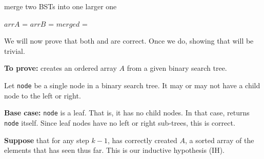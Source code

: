 \documentclass[11pt]{article}
\begin{document}
\begin{algorithm}
\caption{merge two BSTs into one larger one}
\begin{algorithmic}[1]
    \State $arrA$ = 
    \State $arrB$ = 
    \State $merged$ = 
    \State \Return {}
\EndProcedure 
\end{algorithmic}
\end{algorithm}
\pagebreak

We will now prove that both  and  are
correct. Once we do, showing that  will be trivial.

\textbf{To prove:}  creates an ordered array $A$ from a given
binary search tree.

Let \texttt{node} be a single node in a binary search tree. It may or may not
have a child node to the left or right.

\textbf{Base case:} \texttt{node} is a leaf. That is, it has no child nodes. In
that case,  returns \texttt{node} itself. Since leaf nodes
have no left or right sub-trees, this is correct.

\textbf{Suppose} that for any step $k-1$,  has correctly
created $A$, a sorted array of the elements that  has seen
thus far. This is our inductive hypothesis (IH).
\end{document}
